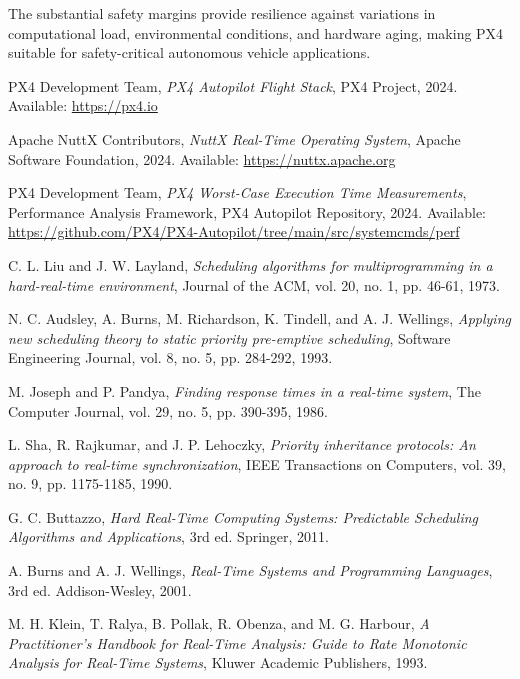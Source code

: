 \documentclass[11pt]{article}
\begin{document}
The substantial safety margins provide resilience against variations in computational load, environmental conditions, and hardware aging, making PX4 suitable for safety-critical autonomous vehicle applications.


\begin{thebibliography}{20}

PX4 Development Team, \textit{PX4 Autopilot Flight Stack}, PX4 Project, 2024. Available: \url{https://px4.io}

Apache NuttX Contributors, \textit{NuttX Real-Time Operating System}, Apache Software Foundation, 2024. Available: \url{https://nuttx.apache.org}

PX4 Development Team, \textit{PX4 Worst-Case Execution Time Measurements}, Performance Analysis Framework, PX4 Autopilot Repository, 2024. Available: \url{https://github.com/PX4/PX4-Autopilot/tree/main/src/systemcmds/perf}

C. L. Liu and J. W. Layland, \textit{Scheduling algorithms for multiprogramming in a hard-real-time environment}, Journal of the ACM, vol. 20, no. 1, pp. 46-61, 1973.

N. C. Audsley, A. Burns, M. Richardson, K. Tindell, and A. J. Wellings, \textit{Applying new scheduling theory to static priority pre-emptive scheduling}, Software Engineering Journal, vol. 8, no. 5, pp. 284-292, 1993.

M. Joseph and P. Pandya, \textit{Finding response times in a real-time system}, The Computer Journal, vol. 29, no. 5, pp. 390-395, 1986.

L. Sha, R. Rajkumar, and J. P. Lehoczky, \textit{Priority inheritance protocols: An approach to real-time synchronization}, IEEE Transactions on Computers, vol. 39, no. 9, pp. 1175-1185, 1990.

G. C. Buttazzo, \textit{Hard Real-Time Computing Systems: Predictable Scheduling Algorithms and Applications}, 3rd ed. Springer, 2011.

A. Burns and A. J. Wellings, \textit{Real-Time Systems and Programming Languages}, 3rd ed. Addison-Wesley, 2001.

M. H. Klein, T. Ralya, B. Pollak, R. Obenza, and M. G. Harbour, \textit{A Practitioner's Handbook for Real-Time Analysis: Guide to Rate Monotonic Analysis for Real-Time Systems}, Kluwer Academic Publishers, 1993.


\end{thebibliography}
\end{document}
